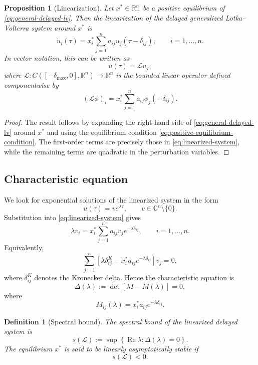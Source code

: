 \documentclass[11pt]{article}
\newtheorem{definition}{Definition}
\newtheorem{proposition}{Proposition}
\begin{document}
 \begin{proposition}[Linearization]
 	\label{prop:linearization}
 	Let $x^\ast\in\mathbb{R}^n_+$ be a positive equilibrium of
 	\eqref{eq:general-delayed-lv}. Then the linearization of the delayed
 	generalized Lotka--Volterra system around $x^\ast$ is
 	\[
 	\dot{u}_i(\tau)
 	=
 	x_i^\ast
 	\sum_{j=1}^{n}
 	a_{ij}u_j(\tau-\delta_{ij}),
 	\qquad i=1,\ldots,n.
 	\]
 	In vector notation, this can be written as
 	\[
 	\dot{u}(\tau)=\mathcal{L}u_\tau,
 	\]
 	where $\mathcal{L}:C([-\delta_{\max},0],\mathbb{R}^n)\to\mathbb{R}^n$ is the
 	bounded linear operator defined componentwise by
 	\[
 	(\mathcal{L}\phi)_i
 	=
 	x_i^\ast
 	\sum_{j=1}^{n}
 	a_{ij}\phi_j(-\delta_{ij}).
 	\]
 \end{proposition}
 
 \begin{proof}
 	The result follows by expanding the right-hand side of
 	\eqref{eq:general-delayed-lv} around $x^\ast$ and using the equilibrium
 	condition \eqref{eq:positive-equilibrium-condition}. The first-order terms are
 	precisely those in \eqref{eq:linearized-system}, while the remaining terms are
 	quadratic in the perturbation variables.
 \end{proof}
 
 \subsection{Characteristic equation}
 
 We look for exponential solutions of the linearized system in the form
 \[
 u(\tau)=v e^{\lambda \tau},
 \qquad v\in\mathbb{C}^n\setminus\{0\}.
 \]
 Substitution into \eqref{eq:linearized-system} gives
 \[
 \lambda v_i
 =
 x_i^\ast
 \sum_{j=1}^{n}
 a_{ij}v_j e^{-\lambda\delta_{ij}},
 \qquad i=1,\ldots,n.
 \]
 Equivalently,
 \[
 \sum_{j=1}^{n}
 \left[
 \lambda\delta_{ij}^{K}
 -
 x_i^\ast a_{ij}e^{-\lambda\delta_{ij}}
 \right]v_j=0,
 \]
 where $\delta_{ij}^{K}$ denotes the Kronecker delta. Hence the characteristic
 equation is
 \begin{equation}
 \label{eq:characteristic-equation-general}
 \Delta(\lambda)
 :=
 \det
 \left[
 \lambda I
 -
 M(\lambda)
 \right]
 =0,
 \end{equation}
 where
 \begin{equation}
 \label{eq:M-lambda}
 M_{ij}(\lambda)
 =
 x_i^\ast a_{ij}e^{-\lambda\delta_{ij}}.
 \end{equation}
 
 \begin{definition}[Spectral bound]
 	The spectral bound of the linearized delayed system is
 	\[
 	s(\mathcal{L})
 	:=
 	\sup
 	\left\{
 	\operatorname{Re}\lambda:
 	\Delta(\lambda)=0
 	\right\}.
 	\]
 	The equilibrium $x^\ast$ is said to be linearly asymptotically stable if
 	\[
 	s(\mathcal{L})<0.
 	\]
 \end{definition}
 
\end{document}
